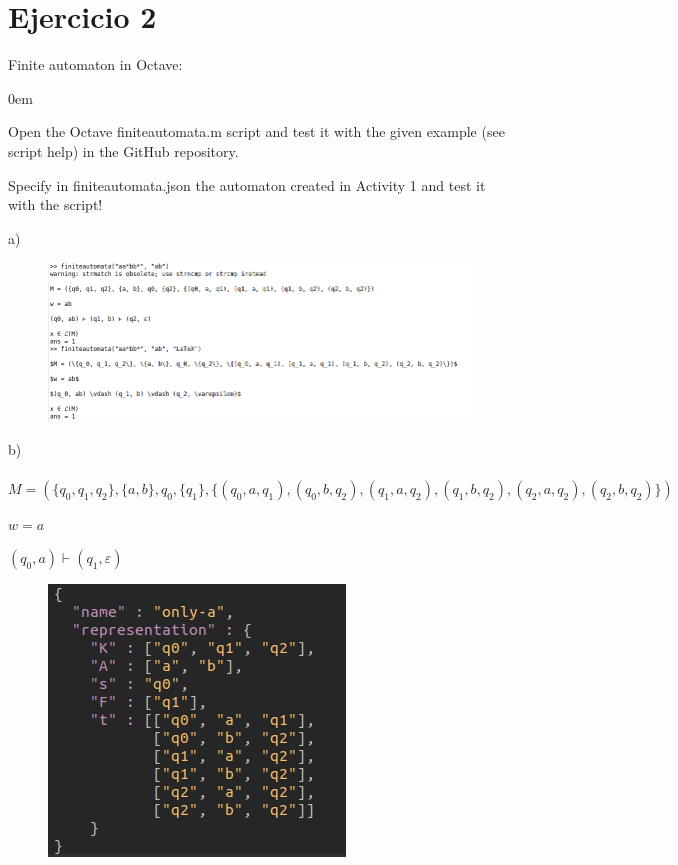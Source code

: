 \documentclass[11pt]{article}
\begin{document}
\newpage
\begin{flushleft}\end{flushleft}
\section*{Ejercicio 2}
Finite automaton in Octave:
\begin{description}
\addtolength{\itemindent}{0.80cm}
\itemsep0em 
\item[a)] Open the Octave finiteautomata.m script and test it with the given example (see script help) in the GitHub repository.
\item[b)] Specify in finiteautomata.json the automaton created in Activity 1 and test it with the script!
\end{description}

\begin{flushleft}\end{flushleft}
a)

\begin{figure}[htp]
\centering
\includegraphics[scale=0.50]{ejemplo-octave.png}
\label{}
\end{figure}

\newpage
\begin{flushleft}\end{flushleft}
b)
\\\\
$M = (\{q_0, q_1, q_2\}, \{a, b\}, q_0, \{q_1\}, \{(q_0, a, q_1), (q_0, b, q_2), (q_1, a, q_2), (q_1, b, q_2), (q_2, a, q_2), (q_2, b, q_2)\})$

$w = a$

$(q_0, a) \vdash (q_1, \varepsilon)$
\begin{figure}[htp]
\centering
\includegraphics[scale=0.60]{only-a-octave.png}
\label{}
\end{figure}
\end{document}
